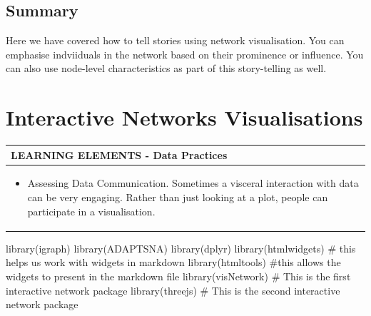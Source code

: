 \documentclass[
  letterpaper,
  DIV=11,
  numbers=noendperiod]{scrreprt}
\newenvironment{Shaded}{\begin{snugshade}}{\end{snugshade}}
\newcommand{\CommentTok}[1]{\textcolor[rgb]{0.37,0.37,0.37}{#1}}
\newcommand{\FunctionTok}[1]{\textcolor[rgb]{0.28,0.35,0.67}{#1}}
\newcommand{\NormalTok}[1]{\textcolor[rgb]{0.00,0.23,0.31}{#1}}
\providecommand{\tightlist}{%
  \setlength{\itemsep}{0pt}\setlength{\parskip}{0pt}}\usepackage{longtable,booktabs,array}
\begin{document}
\section{Summary}\label{summary-7}

Here we have covered how to tell stories using network visualisation.
You can emphasise indviiduals in the network based on their prominence
or influence. You can also use node-level characteristics as part of
this story-telling as well.

\chapter{Interactive Networks
Visualisations}\label{interactive-networks-visualisations}

\begin{longtable}[]{@{}
  >{\raggedright\arraybackslash}p{}@{}}
\toprule\noalign{}
\begin{minipage}[b]{\linewidth}\raggedright
LEARNING ELEMENTS - Data Practices
\end{minipage} \\
\midrule\noalign{}
\endhead
\bottomrule\noalign{}
\endlastfoot
\begin{minipage}[t]{\linewidth}\raggedright
\begin{itemize}
\tightlist
\item
  Assessing Data Communication. Sometimes a visceral interaction with
  data can be very engaging. Rather than just looking at a plot, people
  can participate in a visualisation.
\end{itemize}
\end{minipage} \\
\end{longtable}

\begin{Shaded}
\begin{Highlighting}[]
\FunctionTok{library}\NormalTok{(igraph)}
\FunctionTok{library}\NormalTok{(ADAPTSNA)}
\FunctionTok{library}\NormalTok{(dplyr) }
\FunctionTok{library}\NormalTok{(htmlwidgets) }\CommentTok{\# this helps us work with widgets in markdown}
\FunctionTok{library}\NormalTok{(htmltools) }\CommentTok{\#this allows the widgets to present in the markdown file}
\FunctionTok{library}\NormalTok{(visNetwork) }\CommentTok{\# This is the first interactive network package}
\FunctionTok{library}\NormalTok{(threejs) }\CommentTok{\# This is the second interactive network package}
\end{Highlighting}
\end{Shaded}
\end{document}
